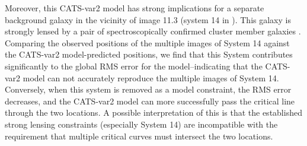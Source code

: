Moreover, this CATS-var2 model has strong implications for a separate
background galaxy in the vicinity of image 11.3 (system 14 in
\citet{Caminha:2017}).  This galaxy is strongly lensed by a pair of
spectroscopically confirmed cluster member galaxies
\citep{Caminha:2017}. Comparing the observed positions of the multiple
images of System 14 against the CATS-var2 model-predicted positions,
we find that this System contributes significantly to the global RMS
error for the model--indicating that the CATS-var2 model can not
accurately reproduce the multiple images of System 14.  Conversely,
when this system is removed as a model constraint, the RMS error
decreases, and the CATS-var2 model can more successfully pass the
critical line through the two \spock locations.  A possible
interpretation of this is that the established strong lensing
constraints (especially System 14) are incompatible with the
requirement that multiple critical curves must intersect the two
\spock locations.
